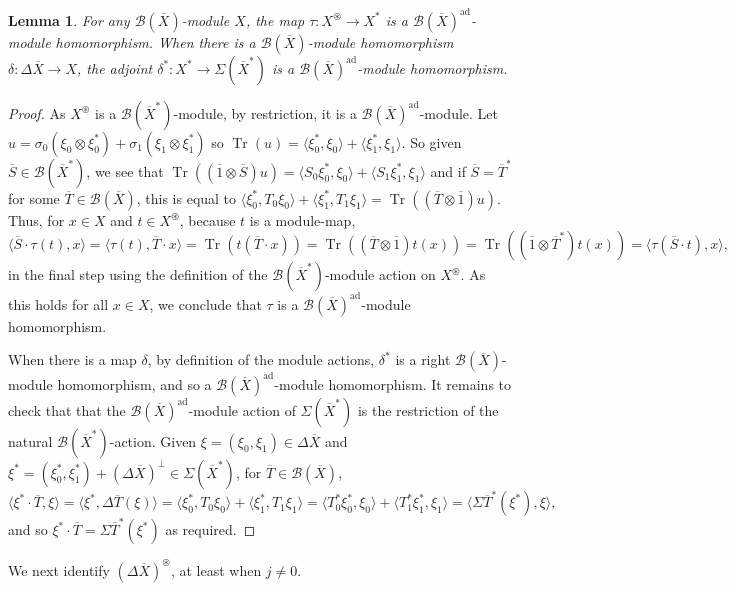 \documentclass[a4paper,11pt]{article}
\theoremstyle{plain}
\newtheorem{lemma}[proposition]{Lemma}
\theoremstyle{remark}
\newcommand{\mc}[1]{\mathcal{#1}}
\newcommand{\ip}[2]{{\langle {#1} , {#2} \rangle}}
\newcommand{\intdual}{\circledast}
\newcommand{\tr}{\operatorname{Tr}}
\newcommand{\ad}{{\operatorname{ad}}}
\begin{document}
\begin{lemma}
For any $\mc B(\overline X)$-module $X$, the map $\tau \colon X^\intdual \to X^*$ is a $\mc B(\overline X)^\ad$-module homomorphism.  When there is a $\mc B(\overline X)$-module homomorphism $\delta \colon \Delta\overline X \to X$, the adjoint $\delta^* \colon X^* \to \Sigma(\overline X^*)$ is a $\mc B(\overline X)^\ad$-module homomorphism.
\end{lemma}
\begin{proof}
As $X^\intdual$ is a $\mc B(\overline X^*)$-module, by restriction, it is a $\mc B(\overline X)^\ad$-module.  Let $u = \sigma_0(\xi_0\otimes\xi_0^*) + \sigma_1(\xi_1\otimes\xi_1^*)$ so $\tr(u) = \ip{\xi_0^*}{\xi_0} + \ip{\xi_1^*}{\xi_1}$.  So given $\overline S \in\mc B(\overline X^*)$, we see that $\tr((\overline 1\otimes\overline S)u) = \ip{S_0\xi_0^*}{\xi_0} + \ip{S_1\xi_1^*}{\xi_1}$ and if $\overline S = \overline T^*$ for some $\overline T\in\mc B(\overline X)$, this is equal to $\ip{\xi_0^*}{T_0\xi_0} + \ip{\xi_1^*}{T_1\xi_1} = \tr((\overline T\otimes\overline 1)u)$.  Thus, for $x\in X$ and $t\in X^\intdual$, because $t$ is a module-map,
\[ \ip{\overline S \cdot \tau(t)}{x}
= \ip{\tau(t)}{\overline T\cdot x}
= \tr( t(\overline T\cdot x) )
= \tr((\overline T\otimes\overline 1)t(x))
= \tr((\overline 1\otimes\overline T^*)t(x))
= \ip{\tau(\overline S \cdot t)}{x}, \]
in the final step using the definition of the $\mc B(\overline X^*)$-module action on $X^\intdual$.  As this holds for all $x\in X$, we conclude that $\tau$ is a $\mc B(\overline X)^\ad$-module homomorphism.

When there is a map $\delta$, by definition of the module actions, $\delta^*$ is a right $\mc B(\overline X)$-module homomorphism, and so a $\mc B(\overline X)^\ad$-module homomorphism.  It remains to check that that the $\mc B(\overline X)^\ad$-module action of $\Sigma(\overline X^*)$ is the restriction of the natural $\mc B(\overline X^*)$-action.  Given $\xi=(\xi_0,\xi_1)\in\Delta\overline X$ and $\xi^* = (\xi_0^*, \xi_1^*) + (\Delta\overline X)^\perp \in \Sigma(\overline X^*)$, for $\overline T\in\mc B(\overline X)$,
\[ \ip{\xi^* \cdot \overline T}{\xi} = \ip{\xi^*}{\Delta\overline T(\xi)}
= \ip{\xi_0^*}{T_0\xi_0} + \ip{\xi_1^*}{T_1\xi_1}
= \ip{T_0^*\xi_0^*}{\xi_0} + \ip{T_1^*\xi_1^*}{\xi_1}
= \ip{\Sigma\overline T^*(\xi^*)}{\xi}, \]
and so $\xi^* \cdot \overline T = \Sigma\overline T^*(\xi^*)$ as required.
\end{proof}

We next identify $(\Delta\overline X)^\intdual$, at least when $j\not=0$.
\end{document}
